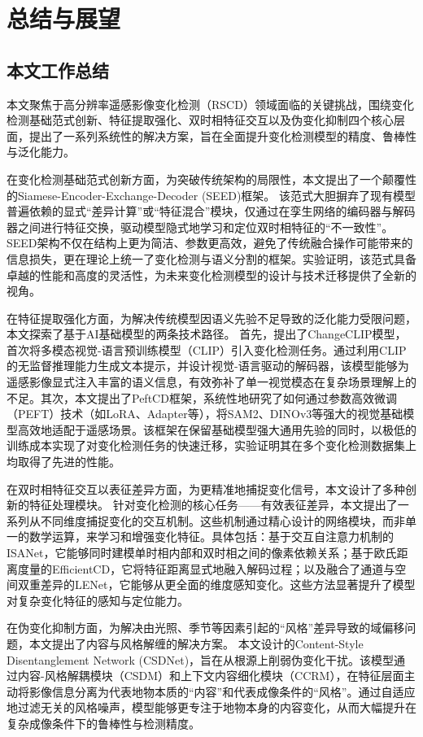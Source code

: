 
\chapter{总结与展望}

\section{本文工作总结}

本文聚焦于高分辨率遥感影像变化检测（RSCD）领域面临的关键挑战，围绕变化检测基础范式创新、特征提取强化、双时相特征交互以及伪变化抑制四个核心层面，提出了一系列系统性的解决方案，旨在全面提升变化检测模型的精度、鲁棒性与泛化能力。

在变化检测基础范式创新方面，为突破传统架构的局限性，本文提出了一个颠覆性的Siamese-Encoder-Exchange-Decoder (SEED)框架。 该范式大胆摒弃了现有模型普遍依赖的显式“差异计算”或“特征混合”模块，仅通过在孪生网络的编码器与解码器之间进行特征交换，驱动模型隐式地学习和定位双时相特征的“不一致性”。SEED架构不仅在结构上更为简洁、参数更高效，避免了传统融合操作可能带来的信息损失，更在理论上统一了变化检测与语义分割的框架。实验证明，该范式具备卓越的性能和高度的灵活性，为未来变化检测模型的设计与技术迁移提供了全新的视角。

在特征提取强化方面，为解决传统模型因语义先验不足导致的泛化能力受限问题，本文探索了基于AI基础模型的两条技术路径。 首先，提出了ChangeCLIP模型，首次将多模态视觉-语言预训练模型（CLIP）引入变化检测任务。通过利用CLIP的无监督推理能力生成文本提示，并设计视觉-语言驱动的解码器，该模型能够为遥感影像显式注入丰富的语义信息，有效弥补了单一视觉模态在复杂场景理解上的不足。其次，本文提出了PeftCD框架，系统性地研究了如何通过参数高效微调（PEFT）技术（如LoRA、Adapter等），将SAM2、DINOv3等强大的视觉基础模型高效地适配于遥感场景。该框架在保留基础模型强大通用先验的同时，以极低的训练成本实现了对变化检测任务的快速迁移，实验证明其在多个变化检测数据集上均取得了先进的性能。

在双时相特征交互以表征差异方面，为更精准地捕捉变化信号，本文设计了多种创新的特征处理模块。 针对变化检测的核心任务——有效表征差异，本文提出了一系列从不同维度捕捉变化的交互机制。这些机制通过精心设计的网络模块，而非单一的数学运算，来学习和增强变化特征。具体包括：基于交互自注意力机制的ISANet，它能够同时建模单时相内部和双时相之间的像素依赖关系；基于欧氏距离度量的EfficientCD，它将特征距离显式地融入解码过程；以及融合了通道与空间双重差异的LENet，它能够从更全面的维度感知变化。这些方法显著提升了模型对复杂变化特征的感知与定位能力。


在伪变化抑制方面，为解决由光照、季节等因素引起的“风格”差异导致的域偏移问题，本文提出了内容与风格解缠的解决方案。 本文设计的Content-Style Disentanglement Network (CSDNet)，旨在从根源上削弱伪变化干扰。该模型通过内容-风格解耦模块（CSDM）和上下文内容细化模块（CCRM），在特征层面主动将影像信息分离为代表地物本质的“内容”和代表成像条件的“风格”。通过自适应地过滤无关的风格噪声，模型能够更专注于地物本身的内容变化，从而大幅提升在复杂成像条件下的鲁棒性与检测精度。



